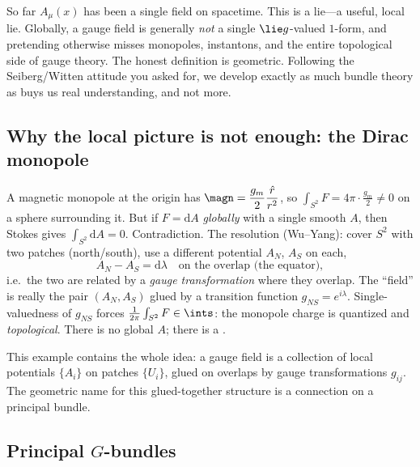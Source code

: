 \documentclass[11pt]{article}
\newcommand{\dd}{\mathrm{d}}                 %
\begin{document}
So far $A_\mu(x)$ has been a single field on spacetime. This is a lie---a useful, local
lie. Globally, a gauge field is generally \emph{not} a single $\lie g$-valued $1$-form,
and pretending otherwise misses monopoles, instantons, and the entire topological side
of gauge theory. The honest definition is geometric. Following the Seiberg/Witten
attitude you asked for, we develop exactly as much bundle theory as buys us real
understanding, and not more.

\subsection{Why the local picture is not enough: the Dirac monopole}

\begin{eexample}
\label{ex:monopole}
A magnetic monopole at the origin has $\magn = \dfrac{g_m}{2}\dfrac{\hat r}{r^2}$, so
$\int_{S^2} F = 4\pi\cdot\frac{g_m}{2}\neq 0$ on a sphere surrounding it. But if
$F=\dd A$ \emph{globally} with a single smooth $A$, then Stokes gives
$\int_{S^2}\dd A = 0$. Contradiction. The resolution (Wu--Yang): cover $S^2$ with two
patches (north/south), use a different potential $A_N$, $A_S$ on each,
\[
A_N - A_S = \dd\lambda \quad\text{on the overlap (the equator)},
\]
i.e.\ the two are related by a \emph{gauge transformation} where they overlap. The
``field'' is really the pair $(A_N,A_S)$ glued by a transition function
$g_{NS}=e^{i\lambda}$. Single-valuedness of $g_{NS}$ forces $\frac{1}{2\pi}\int_{S^2}F
\in\ints$: the monopole charge is quantized and \emph{topological}. There is no global
$A$; there is a .
\end{eexample}

This example contains the whole idea: a gauge field is a collection of local potentials
$\{A_i\}$ on patches $\{U_i\}$, glued on overlaps by gauge transformations $g_{ij}$.
The geometric name for this glued-together structure is a connection on a principal
bundle.

\subsection{Principal \texorpdfstring{$G$}{G}-bundles}
\end{document}
